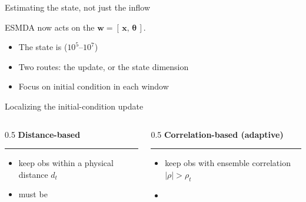 \documentclass[aspectratio=169,11pt]{beamer}
\begin{document}
\begin{frame}{Estimating the state, not just the inflow}
      \smallskip

      ESMDA now acts on the 
      $\bm{w}=[\,\bm{x},\,\bm{\theta}\,]$.
      \medskip
      \begin{itemize}\setlength\itemsep{7pt}
        \item The state is  ($10^5$--$10^7$)
        \item Two routes:  the update, or  the
              state dimension
        \item Focus on initial condition in each window
      \end{itemize}
\end{frame}

\begin{frame}[t]{Localizing the initial-condition update}
  \smallskip
  \begin{columns}[T]
    \begin{column}{0.5\textwidth}
      {\bfseries\color{uaOrange}Distance-based}\\[-3pt]{\color{uaOrange}\rule{\linewidth}{0.8pt}}
      \begin{itemize}\footnotesize\setlength\itemsep{4pt} 
        \item keep obs within a physical distance $d_t$
        \item must be 
      \end{itemize}
    \end{column}
    \begin{column}{0.5\textwidth}
      {\bfseries\color{uaTeal}Correlation-based (adaptive)}\\[-3pt]{\color{uaTeal}\rule{\linewidth}{0.8pt}}
      \begin{itemize}\footnotesize\setlength\itemsep{4pt}
        \item keep obs with ensemble correlation $|\rho|>\rho_t$
        \item {}
      \end{itemize}
    \end{column}
  \end{columns}
\end{frame}
\end{document}

